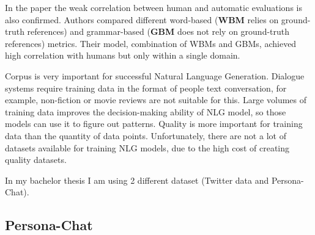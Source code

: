 In the paper \cite{novikova2017we} the weak correlation between human and automatic evaluations is also confirmed. Authors compared different word-based (\textbf{WBM} relies on ground-truth references) and grammar-based (\textbf{GBM} does not rely on ground-truth references) metrics. Their model, combination of WBMs and GBMs, achieved high correlation with humans but only within a single domain.

Corpus is very important for successful Natural Language Generation. Dialogue systems require training data in the format of people text conversation, for example, non-fiction or movie reviews are not suitable for this. Large volumes of training data improves the decision-making ability of NLG model, so those models can use it to figure out patterns. Quality is more important for training data than the quantity of data points. Unfortunately, there are not a lot of datasets available for training NLG models, due to the high cost of creating quality datasets. 

In my bachelor thesis I am using 2 different dataset (Twitter data and Persona-Chat). 

\subsection{Persona-Chat}

